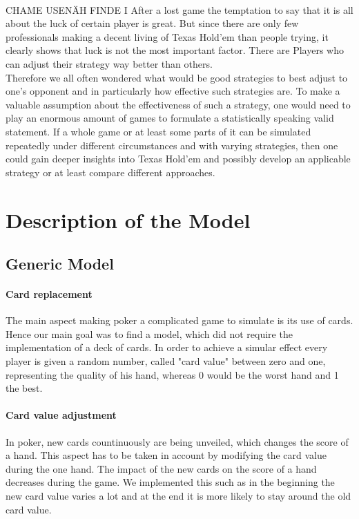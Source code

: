 \documentclass[11pt]{article}
\begin{document}
\\
CHAME USENÄH FINDE I
After a lost game the temptation to say that it is all about the luck of certain player is great. But since there are only few professionals making a decent living of Texas Hold’em than people trying, it clearly shows that luck is not the most important factor. There are Players who can adjust their strategy way better than others.\\ 
Therefore we all often wondered what would be good strategies to best adjust to one’s opponent and in particularly how effective such strategies are. To make a valuable assumption about the effectiveness of such a strategy, one would need to play an enormous amount of games to formulate a statistically speaking valid statement. If a whole game or at least some parts of it can be simulated repeatedly under different circumstances and with varying strategies, then one could gain deeper insights into Texas Hold’em and possibly develop an applicable strategy or at least compare different approaches.

\section{Description of the Model}

\subsection{Generic Model}

\paragraph{Card replacement}
The main aspect making poker a complicated game to simulate is its use of cards. Hence our main goal was to find a model, which did not require the implementation of a deck of cards. In order to achieve a simular effect every player is given a random number, called "card value" between zero and one, representing the quality of his hand, whereas 0 would be the worst hand and 1 the best. 

\paragraph{Card value adjustment}
In poker, new cards countinuously are being unveiled, which changes the score of a hand. This aspect has to be taken in account by modifying the card value during the one hand. The impact of the new cards on the score of a hand decreases during the game. We implemented this such as in the beginning the new card value varies a lot and at the end it is more likely to stay around the old card value.
\end{document}

